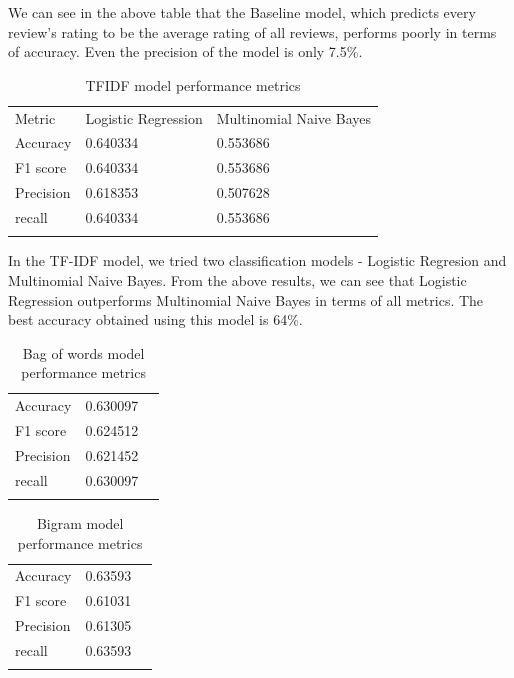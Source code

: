 \documentclass[paper=a4, fontsize=11pt]{scrartcl} %
\numberwithin{equation}{section} %
\numberwithin{figure}{section} %
\numberwithin{table}{section} %
\begin{document}
We can see in the above table that the Baseline model, which predicts every review's rating to be the average rating of all reviews, performs poorly in terms of accuracy. Even the precision of the model is only 7.5\%.

\begin{table}[!htb]
 \centering
 \caption{TFIDF model performance metrics}
 \label{tfidf_performance}
 \begin{tabular}{l l l} 
    \noalign{\smallskip}\hline\noalign{\smallskip}
    Metric & Logistic Regression & Multinomial Naive Bayes\\
    \noalign{\smallskip}\hline\noalign{\smallskip}
    Accuracy & 0.640334	& 0.553686\\
    F1 score & 0.640334	& 0.553686\\
    Precision & 0.618353 & 0.507628\\
    recall & 0.640334 & 0.553686\\
    \noalign{\smallskip}\hline
  \end{tabular} 
\end{table}  

In the TF-IDF model, we tried two classification models - Logistic Regresion and Multinomial Naive Bayes. From the above results, we can see that Logistic Regression outperforms Multinomial Naive Bayes in terms of all metrics. The best accuracy obtained using this model is 64\%.	

\begin{table}[!htb]
 \centering
 \caption{Bag of words model performance metrics}
 \label{bow_performance}
 \begin{tabular}{l l l} 
    \noalign{\smallskip}\hline\noalign{\smallskip}
    Accuracy & 0.630097\\
    F1 score & 0.624512\\
    Precision & 0.621452\\
    recall & 0.630097\\
    \noalign{\smallskip}\hline
  \end{tabular} 
\end{table}  

\begin{table}[!htb]
 \centering
 \caption{Bigram model performance metrics}
 \label{bigram_performance}
 \begin{tabular}{l l l} 
    \noalign{\smallskip}\hline\noalign{\smallskip}
    Accuracy & 0.63593\\
    F1 score & 0.61031\\
    Precision & 0.61305\\
    recall & 0.63593\\
    \noalign{\smallskip}\hline
  \end{tabular} 
\end{table}  
\end{document}
